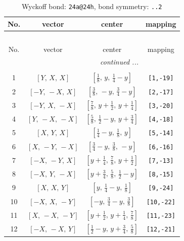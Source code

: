 \documentclass[fleqn,8pt]{jsarticle}
\begin{document}
\begin{longtable}{cccc}
\caption{Wyckoff bond: {\tt 24a@24h}, bond symmetry: {\tt ..2}}
 \\
 \hline \hline
No. & vector & center & mapping \\ \hline \endfirsthead

\multicolumn{3}{l}{\tablename\ \thetable{}} \\
 \hline \hline
No. & vector & center & mapping \\ \hline \endhead

 \hline \hline
\multicolumn{3}{r}{\footnotesize\it continued ...} \\ \endfoot

 \hline \hline
\multicolumn{3}{r}{} \\ \endlastfoot

1 & $\left[ Y,\, X,\, X \right]$ & $\left[ \frac{1}{8},\, y,\, \frac{1}{4} - y \right]$ & {\tt [1,-19]} \\ \hline
2 & $\left[ - Y,\, - X,\, X \right]$ & $\left[ \frac{3}{8},\, - y,\, \frac{3}{4} - y \right]$ & {\tt [2,-17]} \\ \hline
3 & $\left[ - Y,\, X,\, - X \right]$ & $\left[ \frac{7}{8},\, y + \frac{1}{2},\, y + \frac{1}{4} \right]$ & {\tt [3,-20]} \\ \hline
4 & $\left[ Y,\, - X,\, - X \right]$ & $\left[ \frac{5}{8},\, \frac{1}{2} - y,\, y + \frac{3}{4} \right]$ & {\tt [4,-18]} \\ \hline
5 & $\left[ X,\, Y,\, X \right]$ & $\left[ \frac{1}{4} - y,\, \frac{1}{8},\, y \right]$ & {\tt [5,-14]} \\ \hline
6 & $\left[ X,\, - Y,\, - X \right]$ & $\left[ \frac{3}{4} - y,\, \frac{3}{8},\, - y \right]$ & {\tt [6,-16]} \\ \hline
7 & $\left[ - X,\, - Y,\, X \right]$ & $\left[ y + \frac{1}{4},\, \frac{7}{8},\, y + \frac{1}{2} \right]$ & {\tt [7,-13]} \\ \hline
8 & $\left[ - X,\, Y,\, - X \right]$ & $\left[ y + \frac{3}{4},\, \frac{5}{8},\, \frac{1}{2} - y \right]$ & {\tt [8,-15]} \\ \hline
9 & $\left[ X,\, X,\, Y \right]$ & $\left[ y,\, \frac{1}{4} - y,\, \frac{1}{8} \right]$ & {\tt [9,-24]} \\ \hline
10 & $\left[ - X,\, X,\, - Y \right]$ & $\left[ - y,\, \frac{3}{4} - y,\, \frac{3}{8} \right]$ & {\tt [10,-22]} \\ \hline
11 & $\left[ X,\, - X,\, - Y \right]$ & $\left[ y + \frac{1}{2},\, y + \frac{1}{4},\, \frac{7}{8} \right]$ & {\tt [11,-23]} \\ \hline
12 & $\left[ - X,\, - X,\, Y \right]$ & $\left[ \frac{1}{2} - y,\, y + \frac{3}{4},\, \frac{5}{8} \right]$ & {\tt [12,-21]} \\
\end{longtable}
\end{document}
